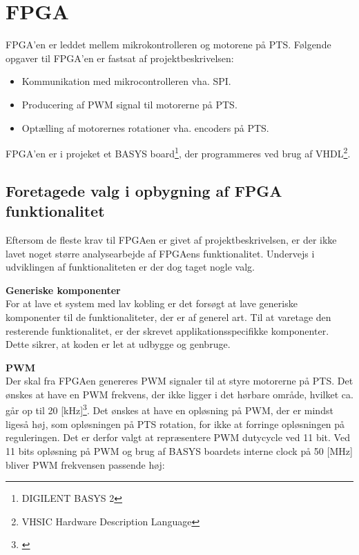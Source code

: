 \section{FPGA}
\label{sec:FPGA}
FPGA'en er leddet mellem mikrokontrolleren og motorene på PTS.
Følgende opgaver til FPGA'en er fastsat af projektbeskrivelsen:

\begin{itemize}
\itemsep1pt
	\item Kommunikation med mikrocontrolleren vha. SPI.
	\item Producering af PWM signal til motorerne på PTS.
	\item Optælling af  motorernes rotationer vha. encoders på PTS.
\end{itemize}

FPGA'en er i projeket et BASYS board\footnote{DIGILENT BASYS 2}, der programmeres ved brug af VHDL\footnote{VHSIC Hardware Description Language}.

\subsection{Foretagede valg i opbygning af FPGA funktionalitet}
Eftersom de fleste krav til FPGAen er givet af projektbeskrivelsen, er der ikke 
lavet noget større analysearbejde af FPGAens funktionalitet. Undervejs i 
udviklingen af funktionaliteten er der dog taget nogle valg.

\textbf{Generiske komponenter}\\
For at lave et system med lav kobling er det forsøgt at lave 
generiske komponenter til de funktionaliteter, der er af generel art. 
Til at varetage den resterende funktionalitet, er der skrevet applikationsspecifikke 
komponenter.
Dette sikrer, at koden er let at udbygge og genbruge.

\textbf{PWM}\\
Der skal fra FPGAen genereres PWM signaler til at styre motorerne på PTS.
Det ønskes at have en PWM frekvens, der ikke ligger i det hørbare område, hvilket ca. går op til 20 [kHz]\footnote{\citep{Hearingrange}}. 
Det ønskes at have en opløsning på PWM, der er mindst ligeså høj, som 
opløsningen på PTS rotation, for ikke at forringe opløsningen på reguleringen. 
Det er derfor valgt at repræsentere PWM dutycycle ved 11 bit. 
Ved 11 bits opløsning på PWM og brug af BASYS boardets interne clock på 50 [MHz] bliver PWM frekvensen passende høj:

